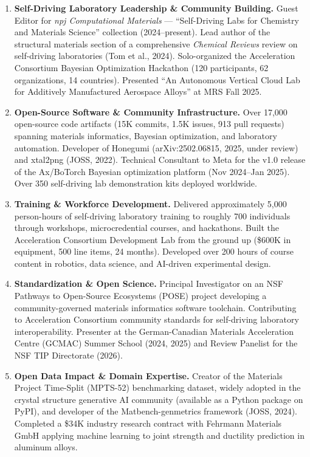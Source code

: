 \documentclass[11pt,letterpaper]{article}
\newif\ifsubmission
\begin{document}
\begin{enumerate}[leftmargin=*]
\item \textbf{Self-Driving Laboratory Leadership \& Community Building.}
  Guest Editor for \textit{npj Computational Materials} --- ``Self-Driving Labs
  for Chemistry and Materials Science'' collection (2024--present). Lead author
  of the structural materials section of a comprehensive \textit{Chemical
  Reviews} review on self-driving laboratories (Tom et al., 2024). Solo-organized
  the Acceleration Consortium Bayesian Optimization Hackathon (120 participants,
  62 organizations, 14 countries). Presented ``An Autonomous Vertical Cloud Lab
  for Additively Manufactured Aerospace Alloys'' at MRS Fall 2025.

\item \textbf{Open-Source Software \& Community Infrastructure.}
  Over 17,000 open-source code artifacts (15K commits, 1.5K issues, 913 pull
  requests) spanning materials informatics, Bayesian optimization, and laboratory
  automation. Developer of Honegumi (arXiv:2502.06815, 2025, under review)
  and xtal2png (JOSS, 2022).
  Technical Consultant to Meta for the v1.0 release of the Ax/BoTorch Bayesian
  optimization platform (Nov 2024--Jan 2025). Over 350 self-driving lab
  demonstration kits deployed worldwide.

\item \textbf{Training \& Workforce Development.}
  Delivered approximately 5,000 person-hours of self-driving laboratory training
  to roughly 700 individuals through workshops, microcredential courses, and
  hackathons. Built the Acceleration Consortium Development Lab from the ground
  up (\$600K in equipment, 500 line items, 24 months). Developed over 200 hours
  of course content in robotics, data science, and AI-driven experimental design.

\item \textbf{Standardization \& Open Science.}
  Principal Investigator on an NSF Pathways to Open-Source Ecosystems (POSE)
  project developing a community-governed materials informatics software
  toolchain. Contributing to Acceleration Consortium community standards for
  self-driving laboratory interoperability. Presenter at the German-Canadian
  Materials Acceleration Centre (GCMAC) Summer School (2024, 2025) and Review
  Panelist for the NSF TIP Directorate (2026).

\item \textbf{Open Data Impact \& Domain Expertise.}
  Creator of the Materials Project Time-Split (MPTS-52) benchmarking dataset,
  widely adopted in the crystal structure generative AI community (available as a
  Python package on PyPI), and developer of the Matbench-genmetrics
  framework (JOSS, 2024). Completed a \$34K industry research contract with
  Fehrmann Materials GmbH applying machine learning to joint strength and
  ductility prediction in aluminum alloys.
\end{enumerate}

\fi %
\end{document}
